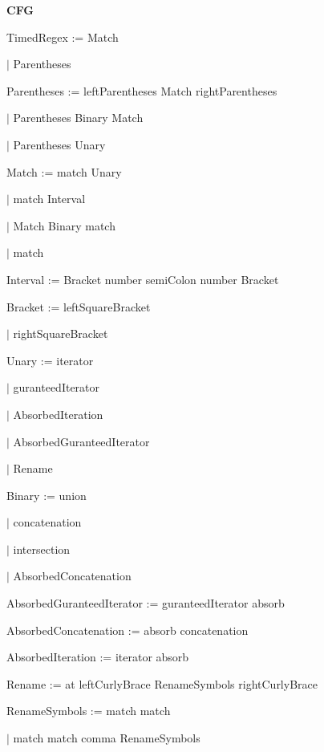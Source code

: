 
\textbf{CFG}

TimedRegex := Match

\qquad	$\mid$ Parentheses

Parentheses := leftParentheses Match rightParentheses

\qquad	$\mid$ Parentheses Binary Match

\qquad	$\mid$ Parentheses Unary

Match := match Unary

\qquad	$\mid$ match Interval

\qquad    $\mid$ Match Binary match

\qquad	$\mid$ match

Interval := Bracket number semiColon number Bracket

Bracket := leftSquareBracket

\qquad	$\mid$ rightSquareBracket

Unary := iterator

\qquad	$\mid$ guranteedIterator

\qquad	$\mid$ AbsorbedIteration

\qquad	$\mid$ AbsorbedGuranteedIterator

\qquad	$\mid$ Rename

Binary := union

\qquad	$\mid$ concatenation

\qquad	$\mid$ intersection

\qquad	$\mid$ AbsorbedConcatenation

AbsorbedGuranteedIterator := guranteedIterator absorb 

AbsorbedConcatenation := absorb concatenation

AbsorbedIteration := iterator absorb 

Rename := at leftCurlyBrace RenameSymbols rightCurlyBrace

RenameSymbols := match match

\qquad	$\mid$ match match comma RenameSymbols
